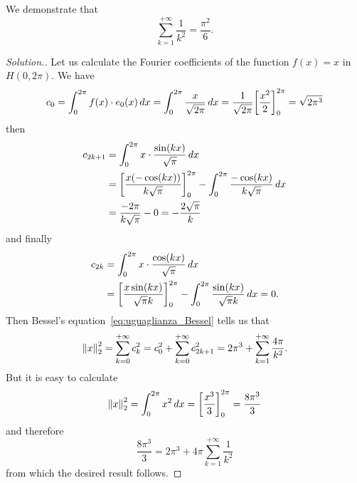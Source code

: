 \begin{exercise}
\label{ex:Basilea}%
We demonstrate that
\begin{equation}\label{eq:basilea}
  \sum_{k=1}^{+\infty} \frac{1}{k^2} = \frac{\pi^2}{6}.
\end{equation}
\end{exercise}
\begin{proof}[Solution.]
Let us calculate the Fourier coefficients of the function $f(x)=x$ in
$H(0,2\pi)$. We have
\[
  c_0 = \int_0^{2\pi} f(x)\cdot e_0(x)\, dx = \int_0^{2\pi}
 \frac{x}{\sqrt{2\pi}}\, dx =
 \frac{1}{\sqrt{2\pi}}{\left[ \frac{x^2}{2} \right]}_0^{2\pi}
  = \sqrt{2\pi^3}
\]
then
\begin{align*}
  c_{2k+1} &= \int_0^{2\pi} x \cdot \frac{\sin(kx)}{\sqrt \pi}\, dx \\
   &= {\left[ \frac{x(-\cos(kx))}{k\sqrt \pi} \right]}_0^{2\pi}
   - \int_0^{2\pi} \frac{-\cos(kx)}{k\sqrt \pi}\, dx\\
   &= \frac{-2\pi}{k\sqrt \pi} - 0 = -\frac{2\sqrt \pi}{k}
\end{align*}
and finally
\begin{align*}
  c_{2k} &= \int_0^{2\pi} x \cdot \frac{\cos (kx)}{\sqrt \pi}\, dx \\
  &= {\left[ \frac{x \sin(kx)}{\sqrt \pi k} \right]}_0^{2\pi}
  - \int_0^{2\pi} \frac{\sin(kx)}{\sqrt \pi k}\, dx
  = 0.
\end{align*}
Then Bessel's equation~\eqref{eq:uguaglianza_Bessel} tells us that
\[
  {\left\Vert x\right\Vert}_2^2 = \sum_{k=0}^{+\infty} c_k^2
  = c_0^2 + \sum_{k=0}^{+\infty} c_{2k+1}^2
  = 2\pi^3 + \sum_{k=1}^{+\infty} \frac{4\pi}{k^2}.
\]
But it is easy to calculate
\[
 {\left\Vert x\right\Vert}_2^2 = \int_0^{2\pi} x^2\, dx = {\left[ \frac{x^3}{3} \right]}_0^{2\pi}
  = \frac{8\pi^3}{3}
\]
and therefore
\[
  \frac{8\pi^3}{3} = 2\pi^3 + 4\pi \sum_{k=1}^{+\infty}\frac{1}{k^2}
\]
from which the desired result follows.
\end{proof}